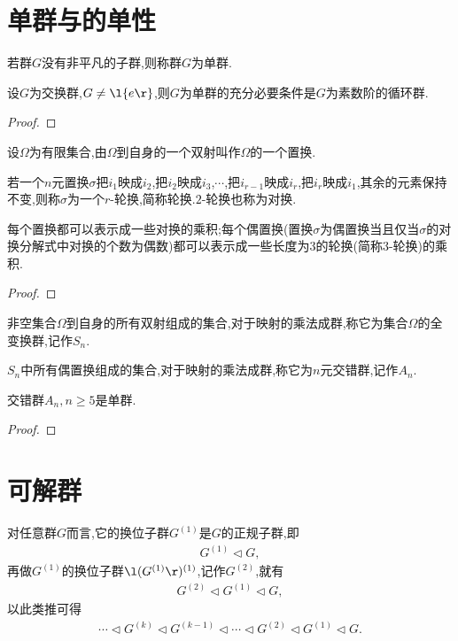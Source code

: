 \section{单群与的单性}
\begin{definition}[单群]
    若群$G$没有非平凡的子群,则称群$G$为单群.
\end{definition}
\begin{theorem}
    设$G$为交换群,$G\neq\l\{e\r\}$,则$G$为单群的充分必要条件是$G$为素数阶的循环群.
\end{theorem}
\begin{proof}
    \stars
\end{proof}
\begin{definition}[置换]
    设$\varOmega$为有限集合,由$\varOmega$到自身的一个双射叫作$\varOmega$的一个置换.
\end{definition}
\begin{definition}[轮换]
    若一个$n$元置换$\sigma$把$i_1$映成$i_2$,把$i_2$映成$i_3$,$\cdots$,把$i_{r-1}$映成$i_r$,把$i_r$映成$i_1$,其余的元素保持不变,则称$\sigma$为一个$r$-轮换,简称轮换.$2$-轮换也称为对换.
\end{definition}
\begin{lemma}\label{p65yl}
    每个置换都可以表示成一些对换的乘积;每个偶置换(置换$\sigma$为偶置换当且仅当$\sigma$的对换分解式中对换的个数为偶数)都可以表示成一些长度为$3$的轮换(简称$3$-轮换)的乘积.
\end{lemma}
\begin{proof}
    \stars
\end{proof}
\begin{definition}[全变换群]
    非空集合$\varOmega$到自身的所有双射组成的集合,对于映射的乘法成群,称它为集合$\varOmega$的全变换群,记作$S_n$.
\end{definition}
\begin{definition}[$n$元交错群]
    $S_n$中所有偶置换组成的集合,对于映射的乘法成群,称它为$n$元交错群,记作$A_n$.
\end{definition}
\begin{theorem}
    交错群$A_n,n\geq5$是单群.
\end{theorem}
\begin{proof}
    \stars
\end{proof}
\section{可解群}\label{jsndaf}
对任意群$G$而言,它的换位子群$G^{(1)}$是$G$的正规子群,即\begin{align*}
    G^{(1)}\lhd G,
\end{align*}再做$G^{(1)}$的换位子群$\l(G^{(1)}\r)^{(1)}$,记作$G^{(2)}$,就有\begin{align*}
    G^{(2)}\lhd G^{(1)}\lhd G,
\end{align*}以此类推可得\begin{align*}
    \cdots\lhd G^{(k)}\lhd G^{(k-1)}\lhd\cdots\lhd G^{(2)}\lhd G^{(1)}\lhd G.
\end{align*}

